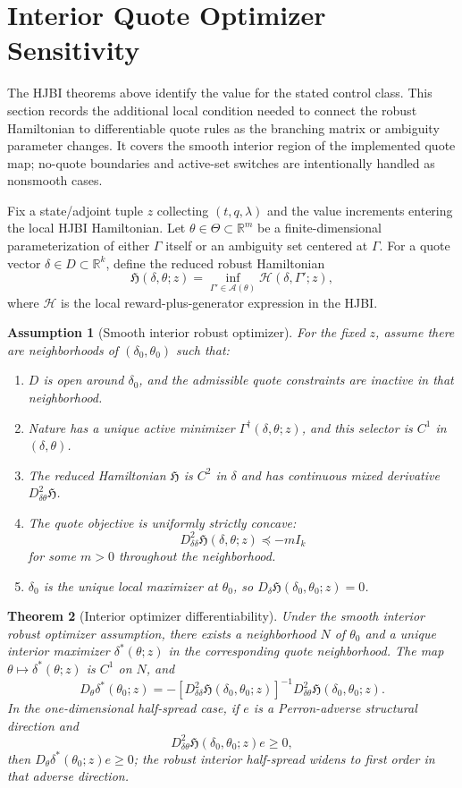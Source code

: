 \documentclass[11pt]{article}
\newtheorem{assumption}{Assumption}
\newtheorem{theorem}[assumption]{Theorem}
\newcommand{\R}{\mathbb{R}}
\begin{document}
\section{Interior Quote Optimizer Sensitivity}

The HJBI theorems above identify the value for the stated control class. This
section records the additional local condition needed to connect the robust
Hamiltonian to differentiable quote rules as the branching matrix or ambiguity
parameter changes. It covers the smooth interior region of the implemented
quote map; no-quote boundaries and active-set switches are intentionally
handled as nonsmooth cases.

Fix a state/adjoint tuple $z$ collecting $(t,q,\lambda)$ and the value
increments entering the local HJBI Hamiltonian. Let $\theta\in\Theta\subset
\R^m$ be a finite-dimensional parameterization of either $\Gamma$ itself or an
ambiguity set centered at $\Gamma$. For a quote vector $\delta\in D\subset
\R^k$, define the reduced robust Hamiltonian
\[
\mathfrak H(\delta,\theta;z)
=\inf_{\Gamma'\in\mathcal A(\theta)}
\mathcal H(\delta,\Gamma';z),
\]
where $\mathcal H$ is the local reward-plus-generator expression in the HJBI.

\begin{assumption}[Smooth interior robust optimizer]
For the fixed $z$, assume there are neighborhoods of
$(\delta_0,\theta_0)$ such that:
\begin{enumerate}
\item $D$ is open around $\delta_0$, and the admissible quote constraints are
inactive in that neighborhood.
\item Nature has a unique active minimizer
$\Gamma^\dagger(\delta,\theta;z)$, and this selector is $C^1$ in
$(\delta,\theta)$.
\item The reduced Hamiltonian $\mathfrak H$ is $C^2$ in $\delta$ and has
continuous mixed derivative $D^2_{\delta\theta}\mathfrak H$.
\item The quote objective is uniformly strictly concave:
\[
D^2_{\delta\delta}\mathfrak H(\delta,\theta;z)\preceq -m I_k
\]
for some $m>0$ throughout the neighborhood.
\item $\delta_0$ is the unique local maximizer at $\theta_0$, so
$D_\delta\mathfrak H(\delta_0,\theta_0;z)=0$.
\end{enumerate}
\end{assumption}

\begin{theorem}[Interior optimizer differentiability]
Under the smooth interior robust optimizer assumption, there exists a
neighborhood $N$ of $\theta_0$ and a unique interior maximizer
$\delta^*(\theta;z)$ in the corresponding quote neighborhood. The map
$\theta\mapsto\delta^*(\theta;z)$ is $C^1$ on $N$, and
\[
D_\theta\delta^*(\theta_0;z)
=
-\left[
D^2_{\delta\delta}\mathfrak H(\delta_0,\theta_0;z)
\right]^{-1}
D^2_{\delta\theta}\mathfrak H(\delta_0,\theta_0;z).
\]
In the one-dimensional half-spread case, if $e$ is a Perron-adverse structural
direction and
\[
D^2_{\delta\theta}\mathfrak H(\delta_0,\theta_0;z)e\ge0,
\]
then $D_\theta\delta^*(\theta_0;z)e\ge0$; the robust interior half-spread
widens to first order in that adverse direction.
\end{theorem}
\end{document}
